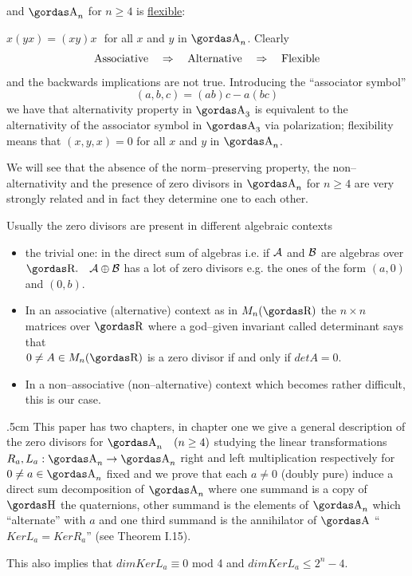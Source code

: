 and $\a_{n}$ for $n\ge 4$ is \underline{flexible}:
\par 
$x(yx)=(xy)x\,\,$ for all $x$ and $y$ in $\a_{n}$. Clearly
$$\hbox{\rm Associative}\quad\Rightarrow\quad
\hbox{\rm Alternative}\quad\Rightarrow\quad\hbox{\rm Flexible}$$
and the backwards implications are not true. Introducing the ``associator 
symbol''
$$(a,b,c)=(ab)c-a(bc)$$
we have that alternativity property in $\a_{3}$ is equivalent to the 
alternativity of the associator symbol in $\a_{3}$ via polarization; flexibility 
means that $(x,y,x)=0$ for all $x$ and $y$ in $\a_{n}$.
\par 
We will see that the absence of the norm--preserving property, the 
non--alternativity and the presence of zero divisors in $\a_{n}$ for $n\ge 4$ are very
strongly related and in fact they determine one to each other. 
\par 
Usually the zero 
divisors are present in different algebraic contexts
\par 
\begin{itemize}                                               
\item[1)]the trivial one: in the direct sum of algebras i.e. if 
${\cal A}$ and ${\cal B}$
are algebras over $\erre.\quad {\cal A} \oplus {\cal B}$ has a lot
of zero divisors e.g. the ones of the form $(a,0)$ and $(0,b)$.
\item[2)]In an associative (alternative) context as in 
$M_{n}(\erre)$ the $n\times n$
matrices over $\erre$ where a god--given invariant called  
determinant says that \\
$0\neq A\in M_{n}(\erre)$ is a zero divisor if and only if $det A=0$.
\item[3)]In a non--associative (non--alternative) context which becomes rather 
difficult, this is our case.
\end{itemize}
\vglue.5cm
This paper has two chapters, in chapter one we give a general description of 
the zero divisors for $\a_{n}\quad (n\ge 4)$ studying the linear transformations
$R_{a},L_{a}:\a_{n}\rightarrow \a_{n}$ right and left multiplication respectively for 
$0\neq a \in \a_{n}$ fixed and  we prove that each $a\neq 0$ (doubly pure)
induce a direct sum 
decomposition of $\a_{n}$ where one summand is a copy of $\ache$ the 
quaternions, 
other summand is the elements of $\a_{n}$ which ``alternate'' with $a$ and one
third
summand is the annihilator of $\a$ ``$Ker L_{a}=Ker R_{a}$'' (see Theorem I.15).
\par 
This also implies that $dim Ker L_{a}\equiv 0$ mod 4 and $dim Ker L_{a}\le 2^{n}-4$.
